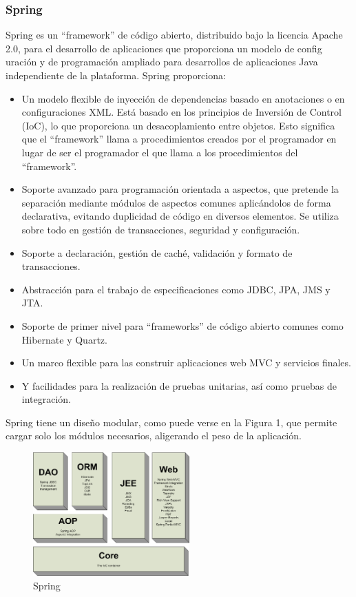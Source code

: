 \documentclass[12pt, a4paper, twoside]{book}
\begin{document}
	\subsubsection{Spring}
	Spring es un “framework” de código abierto, distribuido bajo la licencia Apache
	2.0, para el desarrollo de aplicaciones que proporciona un modelo de config uración y de
	programación ampliado para desarrollos de aplicaciones Java independiente de la
	plataforma. Spring proporciona:
	\begin{itemize}
		\item Un modelo flexible de inyección de dependencias basado en anotaciones o en
		configuraciones XML. Está basado en los principios de Inversión de Control
		(IoC), lo que proporciona un desacoplamiento entre objetos. Esto significa que
		el “framework” llama a procedimientos creados por el programador en lugar de
		ser el programador el que llama a los procedimientos del “framework”.
		\item Soporte avanzado para programación orientada a aspectos, que pretende la
		separación mediante módulos de aspectos comunes aplicándolos de forma
		declarativa, evitando duplicidad de código en diversos elementos. Se utiliza
		sobre todo en gestión de transacciones, seguridad y configuración.
		\item Soporte a declaración, gestión de caché, validación y formato de transacciones.
		\item Abstracción para el trabajo de especificaciones como JDBC, JPA, JMS y JTA.
		\item Soporte de primer nivel para “frameworks” de código abierto comunes como
		Hibernate y Quartz.
		\item Un marco flexible para las construir aplicaciones web MVC y servicios finales.
		\item Y facilidades para la realización de pruebas unitarias, así como pruebas de
		integración.
		
	\end{itemize}
	Spring tiene un diseño modular, como puede verse en la Figura 1, que
	permite cargar solo los módulos necesarios, aligerando el peso de la aplicación.\cite{Spring}
	
	\begin{figure}[H]
		\centering
		\includegraphics[width=6cm]{Imagenes/spring.png}
		\caption{Spring}\label{spring}
	\end{figure}
\end{document}
